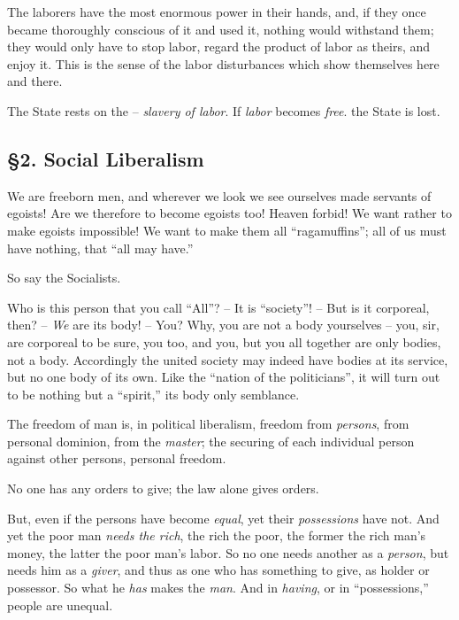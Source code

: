 The laborers have the most enormous power in their hands, and, if they once 
became thoroughly conscious of it and used it, nothing would withstand them; 
they would only have to stop labor, regard the product of labor as theirs, and 
enjoy it. This is the sense of the labor disturbances which show themselves 
here and there.

The State rests on the -- \textit{slavery of labor}. If \textit{labor} becomes 
\textit{free}. the State is lost.

\subsection[\S{}2. Social Liberalism]{\centering \S{}2. Social Liberalism}

We are freeborn men, and wherever we look we see ourselves made servants of 
egoists! Are we therefore to become egoists too! Heaven forbid! We want rather 
to make egoists impossible! We want to make them all ``ragamuffins''; all of 
us must have nothing, that ``all may have.''

So say the Socialists.

Who is this person that you call ``All''? -- It is ``society''! -- But is 
it corporeal, then? -- \textit{We} are its body! -- You? Why, you are not a 
body yourselves -- you, sir, are corporeal to be sure, you too, and you, but 
you all together are only bodies, not a body. Accordingly the united society 
may indeed have bodies at its service, but no one body of its own. Like the 
``nation of the politicians'', it will turn out to be nothing but a 
``spirit,'' its body only semblance.

The freedom of man is, in political liberalism, freedom from \textit{persons}, 
from personal dominion, from the \textit{master}; the securing of each 
individual person against other persons, personal freedom.

No one has any orders to give; the law alone gives orders.

But, even if the persons have become \textit{equal}, yet their 
\textit{possessions} have not. And yet the poor man \textit{needs the rich}, 
the rich the poor, the former the rich man's money, the latter the poor man's 
labor. So no one needs another as a \textit{person}, but needs him as a 
\textit{giver}, and thus as one who has something to give, as holder or 
possessor. So what he \textit{has} makes the \textit{man}. And in 
\textit{having}, or in ``possessions,'' people are unequal.

